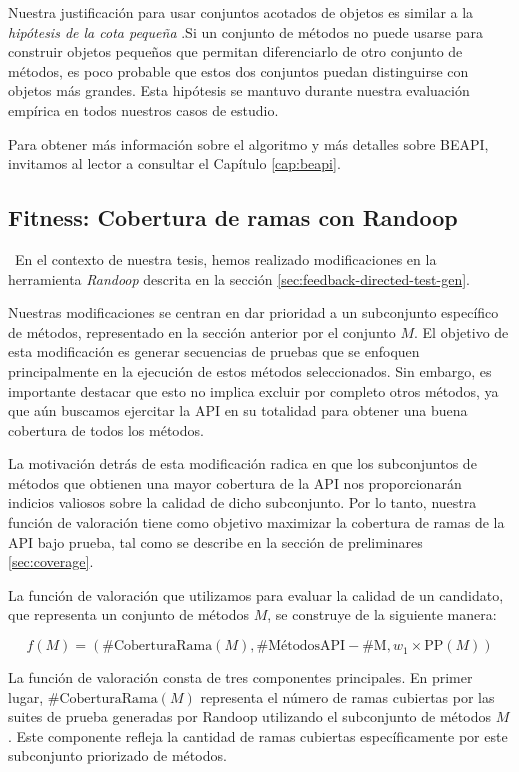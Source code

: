 Nuestra justificación para usar conjuntos acotados de objetos es similar a la \emph{hipótesis de la cota pequeña} \cite{Andoni:2003}.Si un conjunto de métodos no puede usarse para construir objetos pequeños que permitan diferenciarlo de otro conjunto de métodos, es poco probable que estos dos conjuntos puedan distinguirse con objetos más grandes. Esta hipótesis se mantuvo durante nuestra evaluación empírica en todos nuestros casos de estudio.

Para obtener más información sobre el algoritmo y más detalles sobre BEAPI, invitamos al lector a consultar el Capítulo \ref{cap:beapi}.


\subsection{Fitness: Cobertura de ramas con Randoop}
\
En el contexto de nuestra tesis, hemos realizado modificaciones en la herramienta \emph{Randoop} descrita en la sección \ref{sec:feedback-directed-test-gen}.

Nuestras modificaciones se centran en dar prioridad a un subconjunto específico de métodos, representado en la sección anterior por el conjunto $M$. El objetivo de esta modificación es generar secuencias de pruebas que se enfoquen principalmente en la ejecución de estos métodos seleccionados. Sin embargo, es importante destacar que esto no implica excluir por completo otros métodos, ya que aún buscamos ejercitar la API en su totalidad para obtener una buena cobertura de todos los métodos.

La motivación detrás de esta modificación radica en que los subconjuntos de métodos que obtienen una mayor cobertura de la API nos proporcionarán indicios valiosos sobre la calidad de dicho subconjunto. Por lo tanto, nuestra función de valoración tiene como objetivo maximizar la cobertura de ramas de la API bajo prueba, tal como se describe en la sección de preliminares \ref{sec:coverage}.

La función de valoración que utilizamos para evaluar la calidad de un candidato, que representa un conjunto de métodos $M$, se construye de la siguiente manera:

\begin{equation*}
f(M) = (\text{{\#CoberturaRama}}(M), \text{{\#MétodosAPI}} - \text{{\#M}}, w_1 \times \text{{PP}}(M))
\end{equation*}

La función de valoración consta de tres componentes principales. En primer lugar, $\text{{\#CoberturaRama}}(M)$ representa el número de ramas cubiertas por las suites de prueba generadas por Randoop utilizando el subconjunto de métodos $M$. Este componente refleja la cantidad de ramas cubiertas específicamente por este subconjunto priorizado de métodos.

